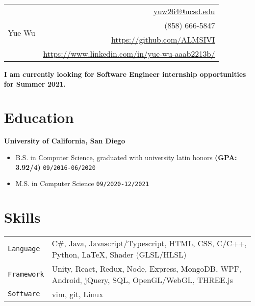 \documentclass[10pt, letterpaper]{article}
\begin{document}
	\begin{tabularx}{\linewidth}{X r}
		\multirow{5}{*}{{\fontsize{50}{60}\selectfont Yue Wu}}
		& \href{mailto:yuw264@ucsd.edu}{yuw264@ucsd.edu} \\
		& (858) 666-5847 \\
		& \href{https://github.com/ALMSIVI}{https://github.com/ALMSIVI} \\
		& \href{https://www.linkedin.com/in/yue-wu-aaab2213b/}{https://www.linkedin.com/in/yue-wu-aaab2213b/}
	\end{tabularx}
	\textbf{I am currently looking for Software Engineer internship opportunities for Summer 2021.}
	\section{Education}
	\smallskip
	\textbf{\large University of California, San Diego}
	\begin{itemize}
		\item B.S. in Computer Science, graduated with university latin honors \textbf{(GPA: 3.92/4)} \hfill \texttt{09/2016-06/2020}
		\item M.S. in Computer Science \hfill \texttt{09/2020-12/2021}
	\end{itemize}
	\section{Skills}
	\smallskip
	\begin{tabularx}{\linewidth}{l X}
		\texttt{Language} & C\#, Java, Javascript/Typescript, HTML, CSS, C/C++, Python, \LaTeX, Shader (GLSL/HLSL) \\
		\texttt{Framework} & Unity, React, Redux, Node, Express, MongoDB, WPF, Android, jQuery, SQL, OpenGL/WebGL, THREE.js \\
		\texttt{Software} & vim, git, Linux
	\end{tabularx}
\end{document}
